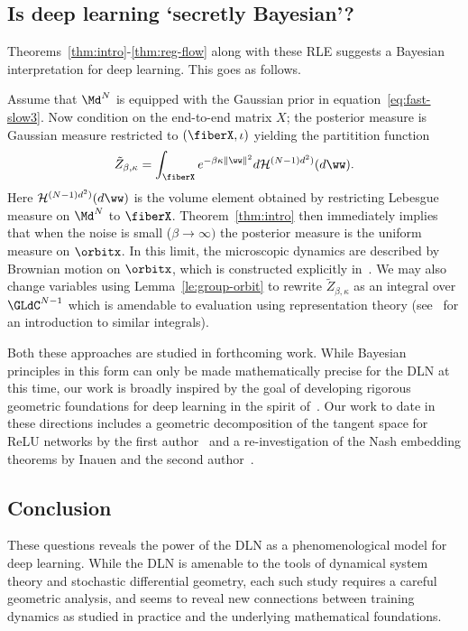 \subsection{Is deep learning `secretly Bayesian'?}
Theorems~\ref{thm:intro}-\ref{thm:reg-flow} along with these RLE suggests a Bayesian interpretation for deep learning. This goes as follows.

Assume that $\Md^N$ is equipped with the Gaussian prior in equation~\eqref{eq:fast-slow3}. Now condition on the end-to-end matrix $X$; the posterior measure is  Gaussian measure restricted to $(\fiberX,\iota)$ yielding the partitition function
\begin{equation}
    \label{eq:fast-slow5}
     \tilde{Z}_{\beta,\kappa} = \int_{\fiberX} e^{-\beta\kappa \|\ww\|^2} d\mathcal{H}^{(N-1)d^2)}(d\ww).
\end{equation}
Here $\mathcal{H}^{(N-1)d^2)}(d\ww)$ is the volume element obtained by restricting Lebesgue measure on $\Md^N$ to $\fiberX$. Theorem~\ref{thm:intro} then immediately implies that when the noise is small ($\beta \to \infty)$ the posterior measure is the uniform measure on $\orbitx$. In this limit, the microscopic dynamics are described by Brownian motion on $\orbitx$, which is constructed explicitly in~\cite{MY-RLE}. We may also change variables using Lemma~\ref{le:group-orbit} to rewrite $\tilde{Z}_{\beta,\kappa}$ as an integral over $\GLdC^{N-1}$ which is amendable to evaluation using representation theory (see~\cite{McSwiggen} for an introduction to similar integrals). 

Both these approaches are studied in forthcoming work. While Bayesian principles in this form can only be made mathematically precise for the DLN at this time, our work is broadly inspired by the goal of developing rigorous geometric foundations for deep learning in the spirit of~\cite{Belkin-Niyogi,LeCun}. Our work to date in these directions includes a geometric decomposition of the tangent space for ReLU networks by the first author~\cite{GrigsbyLindseyPersistentPseudodimension} and a re-investigation of the Nash embedding theorems by Inauen and the second author~\cite{IM}.

\subsection{Conclusion}
 These questions reveals the power of the DLN as a phenomenological model for deep learning. While the DLN is amenable to the tools of dynamical system theory and stochastic differential geometry, each such study requires a careful geometric analysis, and seems to reveal new connections between training dynamics as studied in practice and the underlying mathematical foundations. 


